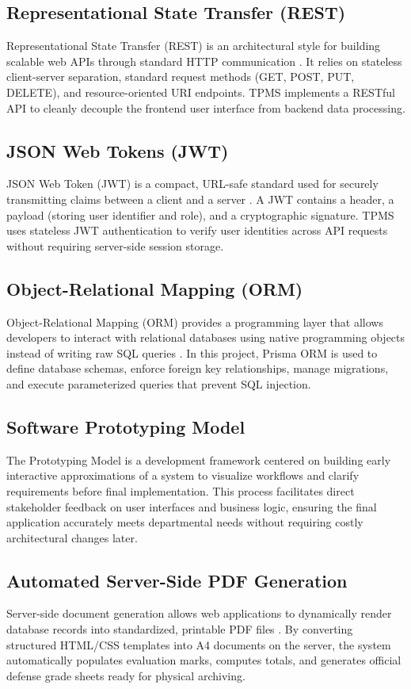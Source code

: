 \documentclass[12pt,a4paper]{report}
\begin{document}
\subsection{Representational State Transfer (REST)}
Representational State Transfer (REST) is an architectural style for building scalable web APIs through standard HTTP communication \cite{fielding2000architectural}. It relies on stateless client-server separation, standard request methods (GET, POST, PUT, DELETE), and resource-oriented URI endpoints. TPMS implements a RESTful API to cleanly decouple the frontend user interface from backend data processing.

\subsection{JSON Web Tokens (JWT)}
JSON Web Token (JWT) is a compact, URL-safe standard used for securely transmitting claims between a client and a server \cite{jones2015jwt}. A JWT contains a header, a payload (storing user identifier and role), and a cryptographic signature. TPMS uses stateless JWT authentication to verify user identities across API requests without requiring server-side session storage.

\subsection{Object-Relational Mapping (ORM)}
Object-Relational Mapping (ORM) provides a programming layer that allows developers to interact with relational databases using native programming objects instead of writing raw SQL queries \cite{prisma2024orm}. In this project, Prisma ORM is used to define database schemas, enforce foreign key relationships, manage migrations, and execute parameterized queries that prevent SQL injection.

\subsection{Software Prototyping Model}
The Prototyping Model is a development framework centered on building early interactive approximations of a system to visualize workflows and clarify requirements before final implementation. This process facilitates direct stakeholder feedback on user interfaces and business logic, ensuring the final application accurately meets departmental needs without requiring costly architectural changes later.

\subsection{Automated Server-Side PDF Generation}
Server-side document generation allows web applications to dynamically render database records into standardized, printable PDF files \cite{puppeteer2024headless}. By converting structured HTML/CSS templates into A4 documents on the server, the system automatically populates evaluation marks, computes totals, and generates official defense grade sheets ready for physical archiving.
\end{document}
